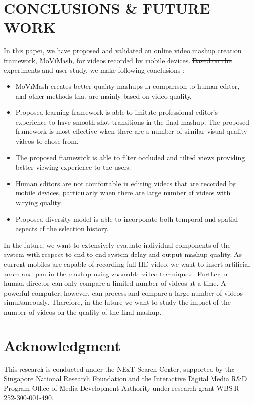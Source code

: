 \documentclass{sig-alternate}
\providecommand{\DIFadd}[1]{{\protect\color{blue}\uwave{#1}}} %
\providecommand{\DIFdel}[1]{{\protect\color{red}\sout{#1}}}                      %
\providecommand{\DIFaddbegin}{} %
\providecommand{\DIFaddend}{} %
\providecommand{\DIFdelbegin}{} %
\providecommand{\DIFdelend}{} %
\begin{document}
\section{CONCLUSIONS & FUTURE WORK}
In this paper, we have proposed and validated an online video
mashup creation framework, MoViMash, for videos recorded by
mobile devices. \DIFdelbegin \DIFdel{Based on the experiments and user study, we make
following conclusions
:
}\DIFdelend \DIFaddbegin \DIFadd{this is conclusions
}\DIFaddend 

\begin{itemize}
    \item  MoViMash creates better quality mashups in comparison to human editor, and other methods that are mainly based on video quality.
    \item Proposed learning framework is able to imitate professional editor’s experience to have smooth shot transitions in the final mashup. The proposed framework is most effective when there are a number of similar visual quality videos to chose from.
    \item The proposed framework is able to filter occluded and tilted views providing better viewing experience to the users.
    \item Human editors are not comfortable in editing videos that are recorded by mobile devices, particularly when there are large number of videos with varying quality.
    \item Proposed diversity model is able to incorporate both temporal and spatial aspects of the selection history.

\end{itemize}
In the future, we want to extensively evaluate individual components of the system with respect to end-to-end system delay and
output mashup quality. As current mobiles are capable of recording full HD video, we want to insert artificial zoom and pan in the
mashup using zoomable video techniques \cite{11}. Further, a human
director can only compare a limited number of videos at a time.
A powerful computer, however, can process and compare a large
number of videos simultaneously. Therefore, in the future we want
to study the impact of the number of videos on the quality of the
final mashup.

\section*{Acknowledgment}
This research is conducted under the NExT Search Center, supported by the Singapore National Research Foundation and the Interactive Digital Media R&D Program Office of Media Development Authority under research grant WBS:R-252-300-001-490.





















  
\end{document}

